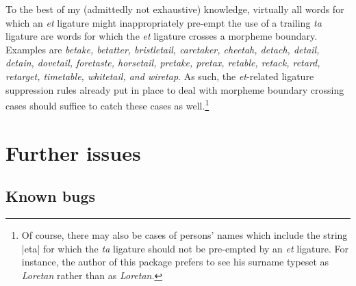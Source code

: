 \documentclass[11pt]{article}
\begin{document}
To the best of my (admittedly not exhaustive) knowledge, virtually all words for which an \emph{et} ligature might inappropriately pre-empt the use of a trailing \emph{ta} ligature are words for which the \emph{et} ligature crosses a morpheme boundary. Examples are \emph{betake, betatter, bristletail, caretaker, cheetah, detach, detail, detain, dovetail, foretaste, horsetail, pretake, pretax, retable, retack, retard, retarget, timetable, whitetail, \emph{and} wiretap}. As such, the \emph{et}-related ligature suppression rules already put in place to deal with morpheme boundary crossing cases should suffice to catch these cases as well.\footnote{Of course, there may also be cases of persons' names which include the string |eta| for which the \emph{ta} ligature should not be pre-empted by an \emph{et} ligature. For instance, the author of this package prefers to see his surname typeset as \emph{Loretan} rather than as \emph{Lor\mbox{et}an}.}




\section{Further issues}

\subsection{Known bugs}
\end{document}
